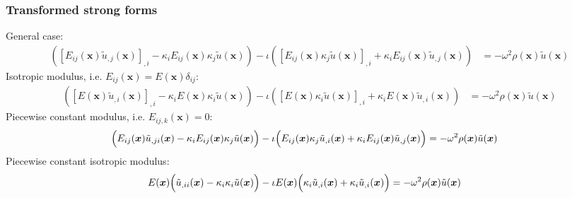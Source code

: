 \documentclass{article}
\newcommand{\imag}{\iota}
\newcommand{\vect}[1]{\boldsymbol{#1}}
\newcommand{\x}{x}
\newcommand{\vecx}{\vect{\x}}
\newcommand{\wavenum}{\kappa}
\newcommand{\kernel}[1]{\tilde{#1}}
\begin{document}
\subsubsection{Transformed strong forms}

General case:
%
\begin{align}
    \left(
        \left[ E_{ij}(\vecx) \kernel{u}_{,j}(\vecx) \right]_{,i}
        - \wavenum_{i} E_{ij}(\vecx) \wavenum_{j} \kernel{u}(\vecx)
    \right) - \imag \left(
        \left[
            E_{ij}(\vecx) \kappa_{j} \kernel{u}(\vecx)
        \right]_{,i}
        + \wavenum_{i} E_{ij}(\vecx) \kernel{u}_{,j}(\vecx)
    \right) &=
    -\omega^2 \rho(\vecx) \kernel{u}(\vecx)
\end{align}
%
Isotropic modulus, i.e. \(E_{ij}(\vecx) = E(\vecx) \delta_{ij}\):
%
\begin{align}
    \left(
        \left[ E(\vecx) \kernel{u}_{,i}(\vecx) \right]_{,i}
        - \wavenum_{i} E(\vecx) \wavenum_{i} \kernel{u}(\vecx)
    \right) - \imag \left(
        \left[
            E(\vecx) \kappa_{i} \kernel{u}(\vecx)
        \right]_{,i}
        + \wavenum_{i} E(\vecx) \kernel{u}_{,i}(\vecx)
    \right) &=
    -\omega^2 \rho(\vecx) \kernel{u}(\vecx)
\end{align}
%
Piecewise constant modulus, i.e. \(E_{ij,k}(\vecx) = 0\):
%
\begin{align}
    \Bigl(
        E_{ij}(\vecx) \kernel{u}_{,ji}(\vecx)
        - \wavenum_{i} E_{ij}(\vecx) \wavenum_{j} \kernel{u}(\vecx)
    \Bigr) - \imag \Bigl(
        E_{ij}(\vecx) \kappa_{j} \kernel{u}_{,i}(\vecx)
        + \wavenum_{i} E_{ij}(\vecx) \kernel{u}_{,j}(\vecx)
    \Bigr) &=
    -\omega^2 \rho(\vecx) \kernel{u}(\vecx)
\end{align}
%
%
Piecewise constant isotropic modulus:
%
\begin{align}
    E(\vecx) \Bigl(
        \kernel{u}_{,ii}(\vecx)
        - \wavenum_{i} \wavenum_{i} \kernel{u}(\vecx)
    \Bigr) - \imag E(\vecx) \Bigl(
        \kappa_{i} \kernel{u}_{,i}(\vecx) + \wavenum_{i} \kernel{u}_{,i}(\vecx)
    \Bigr) &=
    -\omega^2 \rho(\vecx) \kernel{u}(\vecx)
\end{align}
\end{document}
